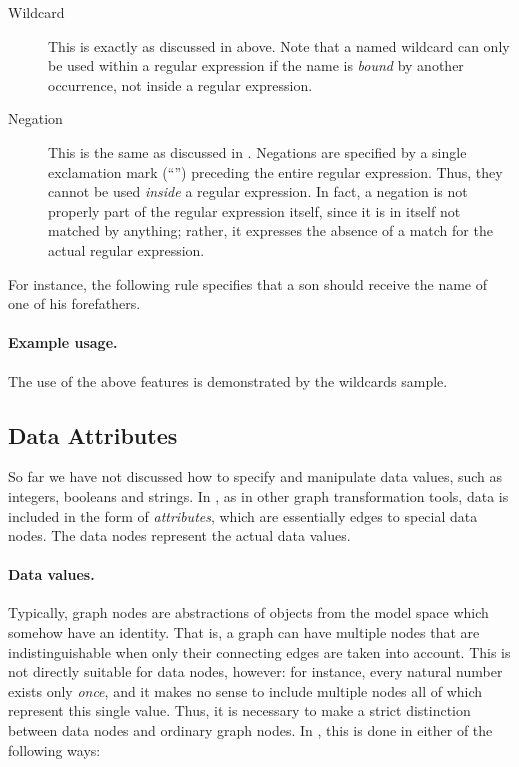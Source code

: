 \begin{description}
\item[Wildcard] This is exactly as discussed in  above.  Note
  that a named wildcard can only be used within a regular expression if the
  name is \emph{bound} by another occurrence, not inside a regular expression.

\item[Negation] This is the same as discussed in . Negations
  are specified by a single exclamation mark (``\lab{!}'') preceding the
  entire regular expression. Thus, they cannot be used \emph{inside} a
  regular expression. In fact, a negation is not properly part of the regular
  expression itself, since it is in itself not matched by anything; rather, it
  expresses the absence of a match for the actual regular expression.
\end{description}

For instance, the following rule specifies that a son should receive the name
of one of his forefathers.


\paragraph{Example usage.}

The use of the above features is demonstrated by the \Groove \textsf{wildcards}
sample.

\subsection{Data Attributes}

So far we have not discussed how to specify and manipulate data values, such as
integers, booleans and strings. In \Groove, as in other graph transformation
tools, data is included in the form of \emph{attributes}, which are essentially
edges to special data nodes. The data nodes represent the actual data values.

\paragraph{Data values.}

Typically, graph nodes are abstractions of objects from the model space which
somehow have an identity. That is, a graph can have multiple nodes that are
indistinguishable when only their connecting edges are taken into account. This
is not directly suitable for data nodes, however: for instance, every natural
number exists only \emph{once}, and it makes no sense to include multiple nodes
all of which represent this single value. Thus, it is necessary to make a
strict distinction between data nodes and ordinary graph nodes. In \Groove,
this is done in either of the following ways:

